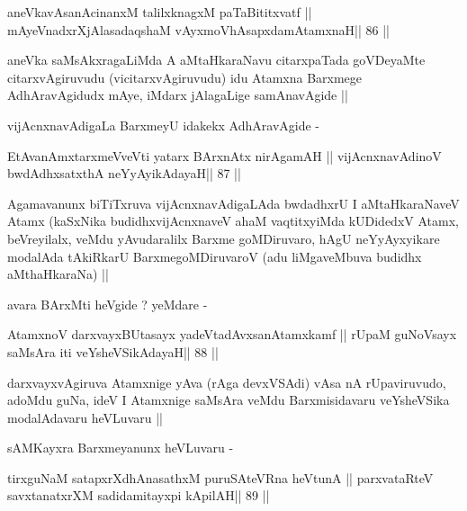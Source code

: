\begin{shl}
aneVkavAsanAcinanxM talilxknagxM paTaBititxvatf ||
mAyeVnadxrXjAlasadaqshaM vAyxmoVhAsapxdamAtamxnaH\hfill || 86 ||
\end{shl}

\begin{artha}
aneVka saMsAkxragaLiMda A aMtaHkaraNavu citarxpaTada goVDeyaMte
citarxvAgiruvudu (vicitarxvAgiruvudu) idu Atamxna Barxmege
AdhAravAgidudx mAye, iMdarx jAlagaLige samAnavAgide ||

vijAcnxnavAdigaLa BarxmeyU idakekx AdhAravAgide -
\end{artha}

\begin{shl}
EtAvanAmxtarxmeVveVti yatarx BArxnAtx nirAgamAH ||
vijAcnxnavAdinoV bwdAdhxsatxthA neYyAyikAdayaH\hfill || 87 ||
\end{shl}

\begin{artha}
Agamavanunx biTiTxruva vijAcnxnavAdigaLAda bwdadhxrU I aMtaHkaraNaveV
Atamx (kaSxNika budidhxvijAcnxnaveV ahaM vaqtitxyiMda kUDidedxV Atamx,
beVreyilalx, veMdu yAvudaralilx Barxme goMDiruvaro, hAgU neYyAyxyikare
modalAda tAkiRkarU BarxmegoMDiruvaroV (adu liMgaveMbuva budidhx
aMthaHkaraNa) ||

avara  BArxMti heVgide ? yeMdare -
\end{artha}

\begin{shl}
AtamxnoV darxvayxBUtasayx yadeVtadAvxsanAtamxkamf ||
rUpaM guNoV\s sayx saMsAra iti veYsheVSikAdayaH\hfill || 88 ||
\end{shl}

\begin{artha}
darxvayxvAgiruva Atamxnige yAva (rAga devxVSAdi) vAsa nA rUpaviruvudo,
adoMdu guNa, ideV I Atamxnige saMsAra veMdu Barxmisidavaru veYsheVSika
modalAdavaru heVLuvaru || 

sAMKayxra Barxmeyanunx heVLuvaru -
\end{artha}

\begin{shl}
tirxguNaM satapxrXdhAnasathxM puruSAteVRna heVtunA ||
parxvataRteV savxtanatxrXM sadidamitayxpi kApilAH\hfill || 89 ||
\end{shl}

